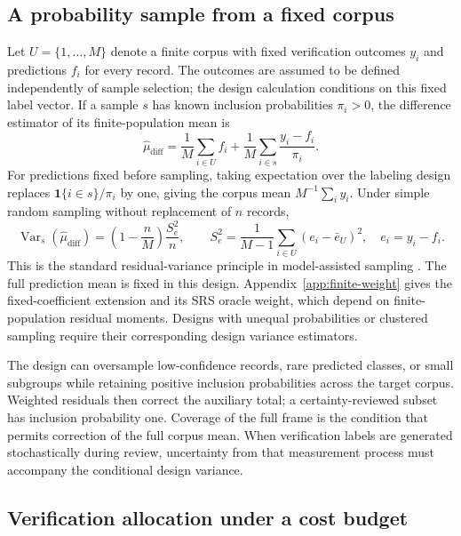 \documentclass[11pt,a4paper]{article}
\newcommand{\Var}{\operatorname{Var}}
\newcommand{\ind}{\mathbf{1}}
\begin{document}
\subsection{A probability sample from a fixed corpus}

Let $U=\{1,\ldots,M\}$ denote a finite corpus with fixed verification outcomes $y_i$ and predictions $f_i$ for every record. The outcomes are assumed to be defined independently of sample selection; the design calculation conditions on this fixed label vector. If a sample $s$ has known inclusion probabilities $\pi_i>0$, the difference estimator of its finite-population mean is
\begin{equation}
 \widehat\mu_{\mathrm{diff}}=
 \frac{1}{M}\sum_{i\in U}f_i
 +\frac{1}{M}\sum_{i\in s}\frac{y_i-f_i}{\pi_i}.
 \label{eq:design}
\end{equation}
For predictions fixed before sampling, taking expectation over the labeling design replaces $\ind\{i\in s\}/\pi_i$ by one, giving the corpus mean $M^{-1}\sum_i y_i$. Under simple random sampling without replacement of $n$ records,
\begin{equation}
 \Var_s(\widehat\mu_{\mathrm{diff}})
 =\left(1-\frac{n}{M}\right)\frac{S_e^2}{n},\qquad
 S_e^2=\frac{1}{M-1}\sum_{i\in U}(e_i-\bar e_U)^2,
 \quad e_i=y_i-f_i.
 \label{eq:finite-var}
\end{equation}
This is the standard residual-variance principle in model-assisted sampling \citep{sarndal1992}. The full prediction mean is fixed in this design. Appendix~\ref{app:finite-weight} gives the fixed-coefficient extension and its SRS oracle weight, which depend on finite-population residual moments. Designs with unequal probabilities or clustered sampling require their corresponding design variance estimators.

The design can oversample low-confidence records, rare predicted classes, or small subgroups while retaining positive inclusion probabilities across the target corpus. Weighted residuals then correct the auxiliary total; a certainty-reviewed subset has inclusion probability one. Coverage of the full frame is the condition that permits correction of the full corpus mean. When verification labels are generated stochastically during review, uncertainty from that measurement process must accompany the conditional design variance.

\subsection{Verification allocation under a cost budget}\label{sec:allocation}
\end{document}
